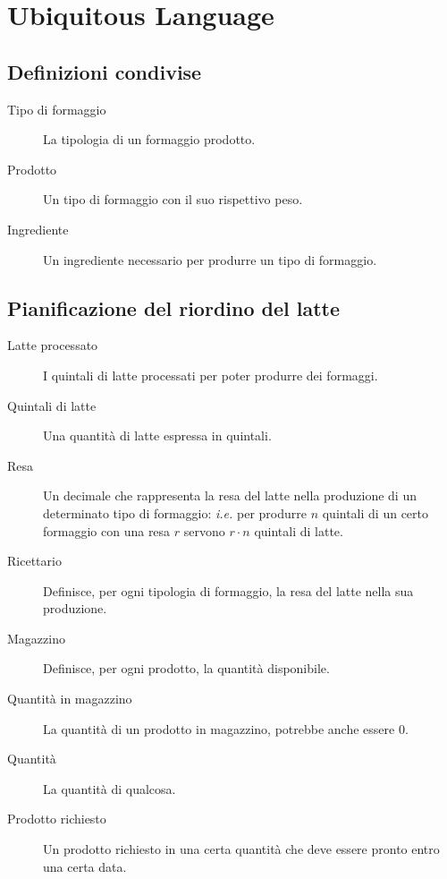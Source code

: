 \chapter{Ubiquitous Language}
\label{app:ubiquitous-language}

\section{Definizioni condivise}
\begin{description}
    \item[Tipo di formaggio] La tipologia di un formaggio prodotto.
    \item[Prodotto] Un tipo di formaggio con il suo rispettivo peso.
    \item[Ingrediente] Un ingrediente necessario per produrre un tipo di formaggio.
\end{description}

\section{Pianificazione del riordino del latte}
\begin{description}
    \item [Latte processato] I quintali di latte processati per poter produrre dei formaggi.
    \item [Quintali di latte] Una quantità di latte espressa in quintali.
    \item [Resa] Un decimale che rappresenta la resa del latte nella produzione di un determinato tipo di formaggio: \textit{i.e.} per produrre $n$ quintali di un certo formaggio con una resa $r$ servono $r \cdot n$ quintali di latte.
    \item [Ricettario] Definisce, per ogni tipologia di formaggio, la resa del latte nella sua produzione.
    \item [Magazzino] Definisce, per ogni prodotto, la quantità disponibile.
    \item [Quantità in magazzino] La quantità di un prodotto in magazzino, potrebbe anche essere 0.
    \item [Quantità] La quantità di qualcosa.
    \item [Prodotto richiesto] Un prodotto richiesto in una certa quantità che deve essere pronto entro una certa data.
\end{description}

